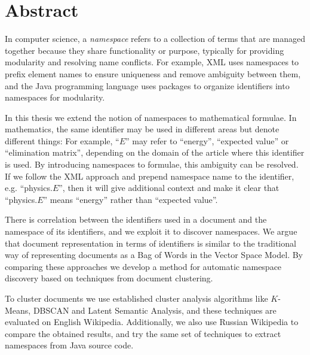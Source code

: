 \section*{Abstract}


In computer science, a \emph{namespace} refers to a collection of 
terms that are managed together because they share functionality or 
purpose, typically for providing modularity and resolving name conflicts. 
For example, XML uses namespaces to prefix element names to ensure uniqueness 
and remove ambiguity between them, and the Java programming language uses 
packages to organize identifiers into namespaces for modularity.

In this thesis we extend the notion of namespaces to mathematical formulae.
In mathematics, the same identifier may be used in different areas 
but denote different things: For example, ``$E$'' may refer to ``energy'', 
``expected value'' or ``elimination matrix'', depending on the domain of the article 
where this identifier is used. By introducing namespaces to 
formulae, this ambiguity can be resolved. If we follow the XML approach
and prepend namespace name to the identifier, e.g. ``physics.$E$'', then it 
will give additional context and make it clear that ``physics.$E$'' means ``energy''
rather than ``expected value''.

There is correlation between  the identifiers used in a document and
the namespace of its identifiers, and we exploit it to discover namespaces.
We argue that document representation in terms of identifiers is 
similar to the traditional way of representing documents as a Bag of Words
in the Vector Space Model. By comparing these approaches we 
develop a method for automatic namespace discovery based on techniques from 
document clustering. 

To cluster documents we use established cluster analysis algorithms like 
$K$-Means, DBSCAN and Latent Semantic Analysis, and these techniques 
are evaluated on English Wikipedia. Additionally, we also use Russian 
Wikipedia to compare the obtained results, and try the same set of 
techniques to extract namespaces from Java source code.
